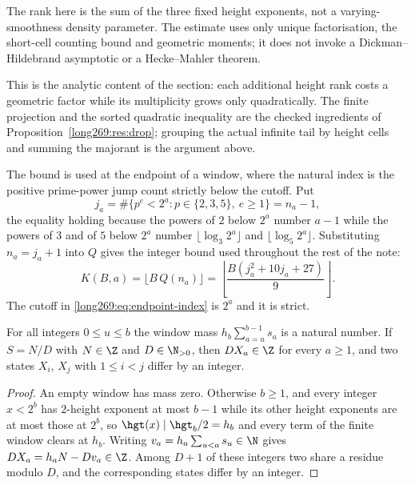 The rank here is the sum of the three fixed height exponents, not a
varying-smoothness density parameter. The estimate uses only unique
factorisation, the short-cell counting bound and geometric moments; it does
not invoke a Dickman--Hildebrand asymptotic or a Hecke--Mahler theorem.

This is the analytic content of the section: each additional height rank costs
a geometric factor while its multiplicity grows only quadratically.  The finite
projection and the sorted quadratic inequality are the checked ingredients of
Proposition~\ref{long269:res:drop}; grouping the actual infinite tail by height cells
and summing the majorant is the argument above.

The bound is used at the endpoint of a window, where the natural index is the
positive prime-power jump count strictly below the cutoff.  Put
\begin{equation}\label{long269:eq:endpoint-index}
 j_a=\#\{p^{e}<2^{a}:p\in\{2,3,5\},\ e\ge1\}=n_a-1 ,
\end{equation}
the equality holding because the powers of $2$ below $2^{a}$ number $a-1$ while
the powers of $3$ and of $5$ below $2^{a}$ number $\lfloor\log_3 2^{a}\rfloor$
and $\lfloor\log_5 2^{a}\rfloor$.  Substituting $n_a=j_a+1$ into $Q$ gives the
integer bound used throughout the rest of the note:
\begin{equation}\label{long269:eq:actual-bound}
 K(B,a)=\bigl\lfloor B\,Q(n_a)\bigr\rfloor
 =\left\lfloor\frac{B(j_a^{2}+10j_a+27)}9\right\rfloor .
\end{equation}
The cutoff in \eqref{long269:eq:endpoint-index} is $2^{a}$ and it is strict.

\begin{lemma}\label{long269:res:all-scale-lattice}
For all integers $0\le u\le b$ the window mass $h_b\sum_{a=u}^{b-1}s_a$ is a
natural number.  If $S=N/D$ with $N\in\Z$ and $D\in\N_{>0}$, then $DX_a\in\Z$
for every $a\ge1$, and two states $X_i$, $X_j$ with $1\le i<j$ differ by an
integer.
\end{lemma}

\begin{proof}
An empty window has mass zero.  Otherwise $b\ge1$, and every integer $x<2^{b}$
has $2$-height exponent at most $b-1$ while its other height exponents are at
most those at $2^{b}$, so $\hgt(x)\mid\hgt_b/2=h_b$ and every term of the
finite window clears at $h_b$.  Writing $v_a=h_a\sum_{u<a}s_u\in\N$ gives
$DX_a=h_aN-Dv_a\in\Z$.  Among $D+1$ of these integers two share a residue
modulo $D$, and the corresponding states differ by an integer.
\end{proof}

